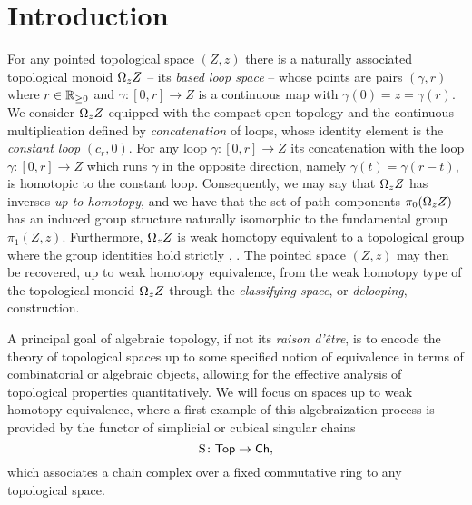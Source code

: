 
\section{Introduction}

For any pointed topological space $(Z,z)$ there is a naturally associated topological monoid $\Omega_z Z$ -- its \textit{based loop space} -- whose points are pairs $(\gamma, r)$ where $r \in \mathbb{R}_{\geq 0}$ and $\gamma \colon [0,r] \to Z$ is a continuous map with $\gamma(0) = z = \gamma(r)$.
We consider $\Omega_z Z$  equipped with the compact-open topology and the continuous multiplication defined by \textit{concatenation} of loops, whose identity element is the \textit{constant loop} $(c_r,0)$.
For any loop $\gamma \colon [0,r] \to Z $ its concatenation with the loop $\overline{\gamma} \colon [0,r] \to Z$ which runs $\gamma$ in the opposite direction, namely $\overline{\gamma}(t) = \gamma(r-t)$, is homotopic to the constant loop.
Consequently, we may say that $\Omega_z Z$ has inverses \textit{up to homotopy}, and we have that the set of path components $\pi_0(\Omega_z Z)$ has an induced group structure naturally isomorphic to the fundamental group $\pi_1(Z,z)$.
Furthermore, $\Omega_z Z$ is weak homotopy equivalent to a topological group where the group identities hold strictly \cite{milnor1956bundles}, \cite{berger1995loops}.
The pointed space $(Z,z)$ may then be recovered, up to weak homotopy equivalence, from the weak homotopy type of the topological monoid $\Omega_z Z$ through the \textit{classifying space}, or \textit{delooping}, construction.

A principal goal of algebraic topology, if not its \textit{raison d'\^{e}tre}, is to encode the theory of topological spaces up to some specified notion of equivalence in terms of combinatorial or algebraic objects, allowing for the effective analysis of topological properties quantitatively.
We will focus on spaces up to weak homotopy equivalence, where a first example of this algebraization process is provided by the functor of simplicial or cubical singular chains
\[
\operatorname{S} \colon \mathsf{Top} \to \mathsf{Ch},
\]
which associates a chain complex over a fixed commutative ring to any topological space.


